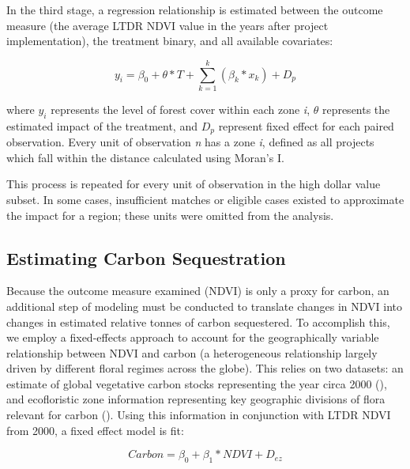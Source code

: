 \documentclass{article}\usepackage[]{graphicx}\usepackage[]{color}
\newenvironment{knitrout}{}{}  %
\begin{document}
\begin{knitrout}
In the third stage, a regression relationship is estimated between the outcome measure (the average LTDR NDVI value in the years after project implementation), the treatment binary, and all available covariates:

\begin{equation}
y_i = \beta_{0} + \theta * T + \sum_{k=1}^{k}(\beta_{k}*x_{k}) + D_{p}
\label{EQgwr}
\end{equation}

where \begin{math}y_{i}\end{math} represents the level of forest cover within each zone \textit{i}, \begin{math}\theta\end{math} represents the estimated impact of the treatment, and \begin{math}D_{p}\end{math} represent fixed effect for each paired observation.
Every unit of observation \textit{n} has a zone \textit{i}, defined as all projects which fall within the distance calculated using Moran's I.

\par

This process is repeated for every unit of observation in the high dollar value subset.  
In some cases, insufficient matches or eligible cases existed to approximate the impact for a region; these units were omitted from the analysis.

\subsection{Estimating Carbon Sequestration}
Because the outcome measure examined (NDVI) is only a proxy for carbon, an additional step of modeling must be conducted to translate changes in NDVI into changes in estimated relative tonnes of carbon sequestered.
To accomplish this, we employ a fixed-effects approach to account for the geographically variable relationship between NDVI and carbon (a heterogeneous relationship largely driven by different floral regimes across the globe).
This relies on two datasets: an estimate of global vegetative carbon stocks representing the year circa 2000 (\cite{saatchi_benchmark_2011}), and ecofloristic zone information representing key geographic divisions of flora relevant for carbon (\cite{ruesch_new_2008}).
Using this information in conjunction with LTDR NDVI from 2000, a fixed effect model is fit:

\begin{equation}
Carbon = \beta_{0} + \beta_{1} * NDVI + D_{ez}
\label{EQcarb}
\end{equation}


\end{knitrout}
\end{document}
